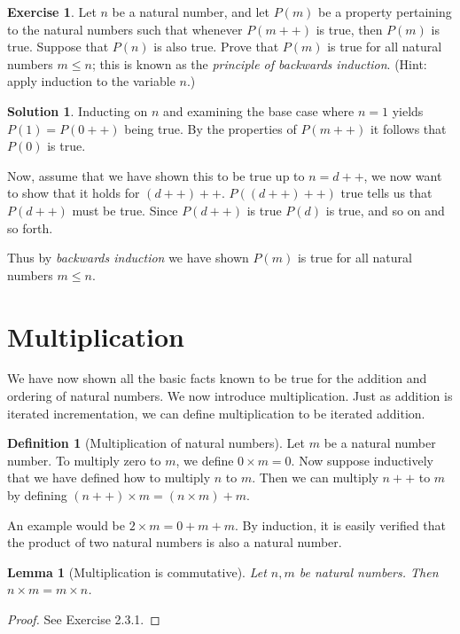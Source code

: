 \documentclass[a4paper, twocolumn]{report}
\newcounter{dummy} \numberwithin{dummy}{section}
\newcounter{exercise} \numberwithin{exercise}{section}
\newtheorem{lma}[dummy]{Lemma}
\theoremstyle{definition}
\newtheorem{defn}[dummy]{Definition}
\newtheorem{exc}[exercise]{Exercise}
\theoremstyle{solution}
\newtheorem*{sltn}{Solution}
\newcommand{\dplus}{{+}{+}} %
\begin{document}
\begin{exc}
  Let $n$ be a natural number, and let $P(m)$ be a property pertaining to the
  natural numbers such that whenever $P(m\dplus)$ is true, then $P(m)$ is true.
  Suppose that $P(n)$ is also true.  Prove that $P(m)$ is true for all natural
  numbers $m \leq n$; this is known as the \textit{principle of backwards
  induction}.  (Hint: apply induction to the variable $n$.)
\end{exc}

\begin{sltn}
  Inducting on $n$ and examining the base case where $n = 1$ yields $P(1) =
  P(0\dplus)$ being true.  By the properties of $P(m\dplus)$ it follows that $P(0)$
  is true.

  Now, assume that we have shown this to be true up to $n = d\dplus$, we now want
  to show that it holds for $(d\dplus)\dplus$.  $P((d\dplus)\dplus)$ true tells
  us that $P(d\dplus)$ must be true. Since $P(d\dplus)$ is true $P(d)$ is true,
  and so on and so forth.

  Thus by \textit{backwards induction} we have shown $P(m)$ is true for all
  natural numbers $m \leq n$. 
\end{sltn}

\section{Multiplication}

We have now shown all the basic facts known to be true for the addition and
ordering of natural numbers.  We now introduce multiplication. Just as addition
is iterated incrementation, we can define multiplication to be iterated
addition.

\begin{defn}[Multiplication of natural numbers]
  \label{defn_231}
  Let $m$ be a natural number number. To multiply zero to $m$, we define $0
  \times m = 0$. Now suppose inductively that we have defined how to multiply
  $n$ to $m$. Then we can multiply $n\dplus$ to $m$ by defining $\left( n\dplus
  \right) \times m = (n \times m) + m$.
\end{defn}

An example would be $2 \times m = 0 + m + m$. By induction, it is easily
verified that the product of two natural numbers is also a natural number.

\begin{lma}[Multiplication is commutative]
  \label{lma_232} 
  Let $n, m$ be natural numbers. Then $n \times m = m \times n$. 
\end{lma}
\begin{proof}
  See Exercise 2.3.1.
\end{proof}
\end{document}
